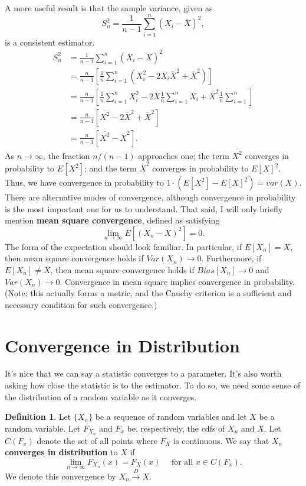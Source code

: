 \documentclass[12pt]{article}
\newcommand{\sumn}{\sum_{i=1}^n}
\newcommand{\xbar}{\overline{X}}
\newcommand{\cdist}{\overset{D}{\rightarrow}}
\theoremstyle{definition}
\newtheorem{definition}{Definition}
\begin{document}
A more useful result is that the sample variance, given as
	\[S^2_n = \frac{1}{n-1} \sumn (X_i - \xbar)^2,	\]
is a consistent estimator. 
\begin{align*}
	S^2_n &= \frac{1}{n-1} \sumn (X_i - \xbar)^2 \\
		&=	\frac{n}{n-1} \left[\frac{1}{n}\sumn (X_i^2 - 2X_i\xbar^2 + \xbar^2) \right]\\
		&=	\frac{n}{n-1} \left[ \frac{1}{n}\sumn X_i^2 - 2\xbar\frac{1}{n}\sumn X_i +  \xbar^2\frac{1}{n}\sumn \right]\\
		&=	\frac{n}{n-1} \left[ \overline{X^2} - 2\xbar^2+ \xbar^2\right]\\
		&=	\frac{n}{n-1} \left[ \overline{X^2} - \xbar^2\right].
\end{align*}
As $n \rightarrow \infty$, the fraction $n/(n-1)$ approaches one; the term $\overline{X^2}$ converges in probability to $E[X^2]$; and the term $\xbar^2$ converges in probability to $E[X]^2$. Thus, we have convergence in probability to  $1 \cdot (E[X^2] - E[X]^2) = var(X)$.\\

There are alternative modes of convergence, although convergence in probability is the most important one for us to understand. That said, I will only briefly mention \textbf{mean square convergence}, defined as  satisfying
	\[\lim_{n \rightarrow \infty} E \left[(X_n - X)^2 \right]=0.	\]
The form of the expectation should look familiar. In particular, if $E[X_n]=X$, then mean square convergence holds if $Var(X_n) \rightarrow 0$. Furthermore, if $E[X_n] \neq X$, then mean square convergence holds if $Bias[X_n] \rightarrow 0$ and $Var(X_n) \rightarrow 0$. Convergence in mean square implies convergence in probability. (Note: this actually forms a metric, and the Cauchy criterion is a sufficient and necessary condition for such convergence.) 



\section{Convergence in Distribution}

It's nice that we can say a statistic converges to a parameter. It's also worth asking how close the statistic is to the estimator. To do so, we need some sense of the distribution of a random variable as it converges. 

\begin{definition}
	Let $\{X_n\}$ be a sequence of random variables and let $X$ be a random variable. Let $F_{X_n}$ and $F_x$ be, respectively, the cdfs of $X_n$ and $X$. Let $C(F_x)$ denote the set of all points where $F_X$ is continuous. We say that $X_n$ \textbf{converges in distribution} to $X$ if
		\[	\lim_{n \rightarrow \infty} F_{X_n}(x) = F_X(x) \quad \text{ for all } x \in C(F_x).\]
	We denote this convergence by $X_n \cdist X$.
\end{definition}
\end{document}
